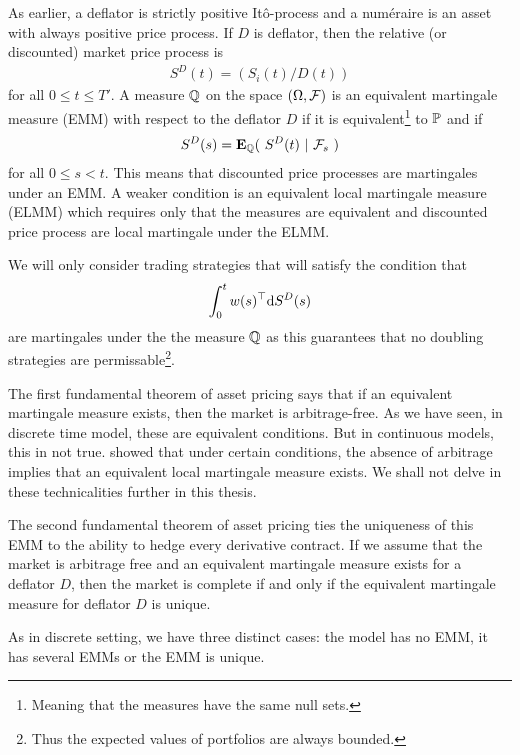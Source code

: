As earlier, a deflator is strictly positive It\^{o}-process and a num\'{e}raire is an asset with always positive price process. If $D$ is deflator, then the relative (or discounted) market price process is
  \begin{align}
    S^D(t) = ( S_i(t) / D(t) )
  \end{align}
for all $0 \leq t \leq T'$. A measure $\mathbb{Q}$ on the space $(\Omega, \mathcal{F})$ is an equivalent martingale measure (EMM) with respect to the deflator $D$ if it is equivalent\footnote{Meaning that the measures have the same null sets.} to $\mathbb{P}$ and if
  \begin{align}
    S^D(s) = \operatorname{\boldsymbol{\mathrm{E}}}_{\mathbb{Q}} ( \ S^D(t) \ | \ \mathcal{F}_s \ )
  \end{align}
for all $0 \leq s < t$. This means that discounted price processes are martingales under an EMM.  A weaker condition is an equivalent local martingale measure (ELMM) which requires only that the measures are equivalent and discounted price process are local martingale under the ELMM.

We will only consider trading strategies that will satisfy the condition that
  \begin{align}
    \int_0^t w(s)^{\top} \mathrm{d} S^D(s)
  \end{align}
are martingales under the the measure $\mathbb{Q}$ as this guarantees that no doubling strategies are permissable\footnote{Thus the expected values of portfolios are always bounded.}.
  
The first fundamental theorem of asset pricing says that if an equivalent martingale measure exists, then the market is arbitrage-free. As we have seen, in discrete time model, these are equivalent conditions. But in continuous models, this in not true. \textcite{delbaenschachermayer1994general} showed that under certain conditions, the absence of arbitrage implies that an equivalent local martingale measure exists. We shall not delve in these technicalities further in this thesis.

The second fundamental theorem of asset pricing ties the uniqueness of this EMM to the ability to hedge every derivative contract. If we assume that the market is arbitrage free and an equivalent martingale measure exists for a deflator $D$, then the market is complete if and only if the equivalent martingale measure for deflator $D$ is unique.

As in discrete setting, we have three distinct cases: the model has no EMM, it has several EMMs or the EMM is unique. 

